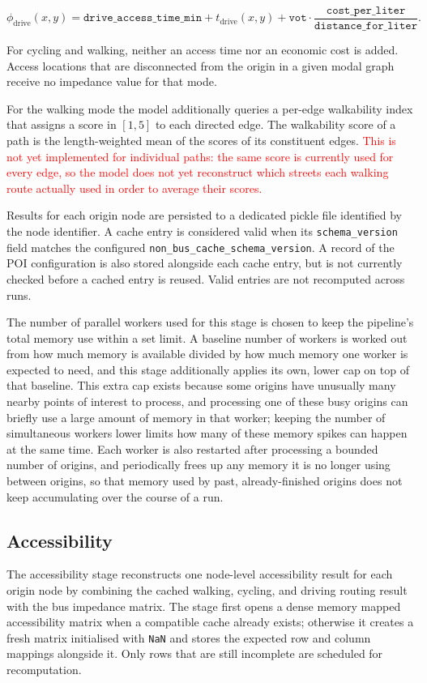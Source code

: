 \documentclass{article}
\newcommand{\notimpl}[1]{\textcolor{red}{#1}}
\begin{document}
\begin{equation}
    \phi_{\text{drive}}(x,y)
    =
    \texttt{drive\_access\_time\_min}
    +
    t_{\text{drive}}(x,y)
    +
    \texttt{vot} \cdot \frac{\texttt{cost\_per\_liter}}{\texttt{distance\_for\_liter}}.
\end{equation}

\noindent For cycling and walking,
neither an access time nor an economic cost is added. Access locations that are disconnected from the origin in a given modal graph receive no impedance value for that mode.

For the walking mode the model additionally queries a per-edge walkability
index that assigns a score in \([1,5]\) to each directed edge. The walkability
score of a path is the length-weighted mean of the scores of its constituent
edges. \notimpl{This is not yet implemented for individual paths: the same
score is currently used for every edge, so the model does not yet reconstruct
which streets each walking route actually used in order to average their
scores.}

Results for each origin node are persisted to a dedicated pickle file
identified by the node identifier. A cache entry is considered valid when its
\texttt{schema\_version} field matches the configured
\texttt{non\_bus\_\allowbreak cache\_\allowbreak schema\_\allowbreak version}. A record of the POI
configuration is also stored alongside each cache entry, but is not currently
checked before a cached entry is reused. Valid entries are not recomputed
across runs.

The number of parallel workers used for this stage is chosen to keep the
pipeline's total memory use within a set limit. A baseline number of workers
is worked out from how much memory is available divided by how much memory
one worker is expected to need, and this stage additionally applies its own,
lower cap on top of that baseline. This extra cap exists because some origins
have unusually many nearby points of interest to process, and processing one
of these busy origins can briefly use a large amount of memory in that
worker; keeping the number of simultaneous workers lower limits how many of
these memory spikes can happen at the same time. Each
worker is also restarted after processing a bounded number of origins, and
periodically frees up any memory it is no longer using between origins, so
that memory used by past, already-finished origins does not keep
accumulating over the course of a run.

\subsection{Accessibility}
The accessibility stage reconstructs one node-level accessibility result for
each origin node by combining the cached walking, cycling, and driving routing result with the bus
impedance matrix. The stage first opens a dense memory mapped accessibility
matrix when a compatible cache already exists; otherwise it creates a fresh
matrix initialised with \texttt{NaN} and stores the expected row and column
mappings alongside it. Only rows that are still incomplete are scheduled for
recomputation.
\end{document}
